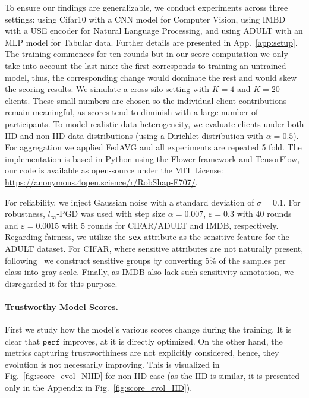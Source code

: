 \documentclass{uai2026}
\begin{document}
To ensure our findings are generalizable, we conduct experiments across three settings: using Cifar10 with a CNN model for Computer Vision, using IMBD with a USE encoder for Natural Language Processing, and using ADULT with an MLP model for Tabular data. Further details are presented in App.~\ref{app:setup}. The training commences for ten rounds but in our score computation we only take into account the last nine: the first corresponds to training an untrained model, thus, the corresponding change would dominate the rest and would skew the scoring results. We simulate a cross-silo setting with $K=4$ and $K=20$ clients. These small numbers are chosen so the individual client contributions remain meaningful, as scores tend to diminish with a large number of participants. To model realistic data heterogeneity, we evaluate clients under both IID and non-IID data distributions (using a Dirichlet distribution with $\alpha=0.5$). For aggregation we applied FedAVG and all experiments are repeated 5 fold. The implementation is based in Python using the Flower framework and TensorFlow, our code is available as open-source under the MIT License: \url{https://anonymous.4open.science/r/RobShap-F707/}.

For reliability, we inject Gaussian noise with a standard deviation of $\sigma=0.1$. For robustness, $l_\infty$-PGD was used with step size $\alpha=0.007$, $\varepsilon=0.3$ with 40 rounds and $\varepsilon=0.0015$ with 5 rounds for CIFAR/ADULT and IMDB, respectively. Regarding fairness, we utilize the \texttt{sex} attribute as the sensitive feature for the ADULT dataset. For CIFAR, where sensitive attributes are not naturally present, following~\cite{wang2020towards} we construct sensitive groups by converting 5\% of the samples per class into gray-scale. Finally, as IMDB also lack such sensitivity annotation, we disregarded it for this purpose.

\paragraph{Trustworthy Model Scores. }

First we study how the model's various scores change during the training. It is clear that $\mathtt{perf}$ improves, at it is directly optimized. On the other hand, the metrics capturing trustworthiness are not explicitly considered, hence, they evolution is not necessarily improving. This is visualized in Fig.~\ref{fig:score_evol_NIID} for non-IID case (as the IID is similar, it is presented only in the Appendix in Fig.~\ref{fig:score_evol_IID}).
\end{document}
